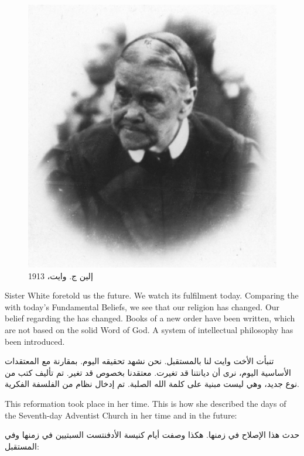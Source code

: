 \begin{figure}
    \centering
    \includegraphics[width=1\linewidth]{images/ellen-white-1913.jpg}
    \caption*{إلين ج. وايت، 1913}
    \label{fig:e-white-1913}
\end{figure}


Sister White foretold us the future. We watch its fulfilment today. Comparing the  with today’s Fundamental Beliefs, we see that our religion has changed. Our belief regarding the  has changed. Books of a new order have been written, which are not based on the solid Word of God. A system of intellectual philosophy has been introduced.


تنبأت الأخت وايت لنا بالمستقبل. نحن نشهد تحقيقه اليوم. بمقارنة  مع المعتقدات الأساسية اليوم، نرى أن ديانتنا قد تغيرت. معتقدنا بخصوص  قد تغير. تم تأليف كتب من نوع جديد، وهي ليست مبنية على كلمة الله الصلبة. تم إدخال نظام من الفلسفة الفكرية.


This reformation took place in her time. This is how she described the days of the Seventh-day Adventist Church in her time and in the future:


حدث هذا الإصلاح في زمنها. هكذا وصفت أيام كنيسة الأدفنتست السبتيين في زمنها وفي المستقبل:


